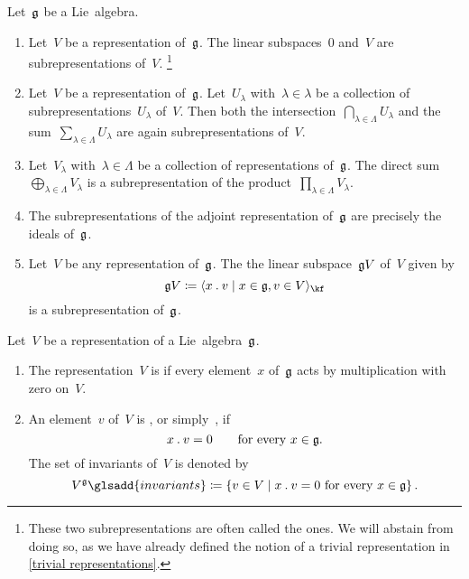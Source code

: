 \begin{examples}
  Let~$\mathfrak{g}$ be a Lie~algebra.
  \begin{enumerate}
    \item
      Let~$V$ be a representation of~$\mathfrak{g}$.
      The linear subspaces~$0$ and~$V$ are subrepresentations of~$V$.%
    \footnote{
      These two subrepresentations are often called the  ones.
      We will abstain from doing so, as we have already defined the notion of a trivial representation in \cref{trivial representations}.
    }
    \item
      Let~$V$ be a representation of~$\mathfrak{g}$.
      Let~$U_\lambda$ with~$\lambda \in \lambda$ be a collection of subrepresentations~$U_\lambda$ of~$V$.
      Then both the intersection~$\bigcap_{\lambda \in \Lambda} U_\lambda$ and the sum~$\sum_{\lambda \in \Lambda} U_\lambda$ are again subrepresentations of~$V$.
    \item
      Let~$V_\lambda$ with~$\lambda \in \Lambda$ be a collection of representations of~$\mathfrak{g}$.
      The direct sum~$\bigoplus_{\lambda \in \Lambda} V_\lambda$ is a subrepresentation of the product~$\prod_{\lambda \in \Lambda} V_\lambda$.
    \item
      The subrepresentations of the adjoint representation of~$\mathfrak{g}$ are precisely the ideals of~$\mathfrak{g}$.
    \item
      Let~$V$ be any representation of~$\mathfrak{g}$.
      The the linear subspace~$\mathfrak{g} V$ of~$V$ given by
      \[
        \glie V
        \defined
        \gen{
          x \act v
          \suchthat
          x \in \glie,
          v \in V
        }_{\kf}
      \]
      is a subrepresentation of~$\mathfrak{g}$.
  \end{enumerate}
\end{examples}


\begin{definition}
  \label{trivial representations}
  Let~$V$ be a representation of a Lie~algebra~$\mathfrak{g}$.
  \begin{enumerate}
    \item
      The representation~$V$ is  if every element~$x$ of~$\mathfrak{g}$ acts by multiplication with zero on~$V$.
    \item
      An element~$v$ of~$V$ is , or simply~, if
      \[
        x \mathbin{.} v = 0
        \qquad
        \text{for every~$x \in \mathfrak{g}$.}
      \]
      The set of invariants of~$V$ is denoted by
      \[
        V^{\glie}\glsadd{invariants}
        \defined
        \{
          v \in V
        \suchthat
          \text{$x \act v = 0$ for every~$x \in \glie$}
        \}  \,.
      \]
  \end{enumerate}  
\end{definition}


